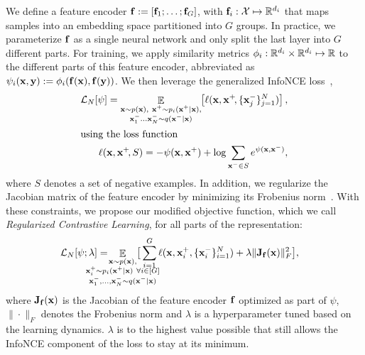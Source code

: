     We define a feature encoder $\mathbf{f} := [\mathbf{f}_1; \dots; \mathbf{f}_G]$, with $\mathbf{f}_i: \mathcal{X} \mapsto \mathbb{R}^{d_i}$ that maps samples into an embedding space partitioned into $G$ groups. In practice, we parameterize $\mathbf{f}$ as a single neural network and only split the last layer into $G$ different parts.
    For training, we apply similarity metrics $\phi_i: \mathbb{R}^{d_i} \times \mathbb{R}^{d_i} \mapsto \mathbb{R}$ to the different parts of this feature encoder,
    abbreviated as $\psi_i(\mathbf{x}, \mathbf{y}) := \phi_i(\mathbf{f}(\mathbf{x}), \mathbf{f}(\mathbf{y}))$. We then leverage the generalized InfoNCE loss~\citep{schneider2023cebra},
    \begin{align}\label{def:infonce}
        \mathcal L_N[\psi] = \mathop{\mathbb{E}}\limits_{{\substack{
            \mathbf{x} \sim p(\mathbf{x}),\  
            \mathbf{x}^+ \sim p_i(\mathbf{x}^+|\mathbf{x}),\\
            \mathbf{x}^-_1 \dots \mathbf{x}^-_N \sim q(\mathbf{x}^-|\mathbf{x})\\
        }}}
        \hspace{-.25em}
        \left[ \ell(\mathbf{x},\mathbf{x}^+\!, \{\mathbf{x}^-_j\}_{j=1}^{N})\right], \\
        \intertext{using the loss function}
        \ell(\mathbf{x},\mathbf{x}^+\!, S) = - \psi(\mathbf{x}, \mathbf{x}^+)
                    + \log \sum_{\mathbf{x}^- \in S} e^{\psi(\mathbf{x}, \mathbf{x}^-)},
    \end{align}
    where $S$ denotes a set of negative examples.
    In addition, we regularize the Jacobian matrix of the feature encoder by minimizing its Frobenius norm~\citep{hoffman2019robust}. With these constraints, we propose our modified objective function, which we call \emph{Regularized Contrastive Learning}, for all parts of the representation:
    \begin{equation}
    \begin{aligned}
        &\mathcal L_N[\psi; \lambda] = \hspace{-2.5em}
        \mathop{\mathbb{E}}\limits_{{\substack{
            \xx \sim p(\xx),\\ 
            \xx_i^+ \sim p_i(\xx^+|\xx) \ \forall i\in[G]\\
            \xx^-_1{,}\dots {,} \xx^-_N \sim q(\xx^-|\xx)
        }}} \hspace{-2.5em}
        \big[ \sum_{i=1}^{G} \ell(\xx,\xx^+_i,\{\xx^-_i\}_{i=1}^{N})
        + 
        \lambda \| \JJ_\ff(\xx) \|_F^2
        \big],
        \label{eq:generalized-infonce}
        \end{aligned}
    \end{equation}
    where $\mathbf{J}_{\mathbf{f}}(\mathbf{x})$ is the Jacobian of the feature encoder $\mathbf{f}$ optimized as part of $\psi$, $\|\cdot\|_F$ denotes the Frobenius norm and $\lambda$ is a hyperparameter tuned based on the learning dynamics. $\lambda$ is  to the highest value possible that still allows the InfoNCE component of the loss to stay at its minimum.

